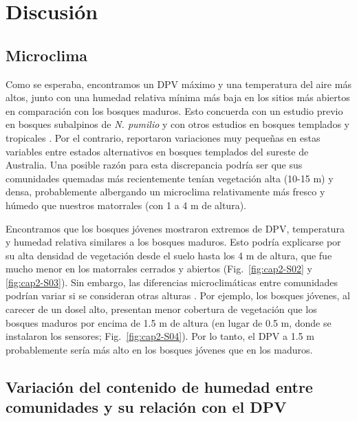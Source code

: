 \FloatBarrier

\section{Discusión}

\subsection{Microclima}

Como se esperaba, encontramos un DPV máximo y una temperatura del aire más altos, junto con una humedad relativa mínima más baja en los sitios más abiertos en comparación con los bosques maduros. Esto concuerda con un estudio previo en bosques subalpinos de \textit{N. pumilio} \citep{paritsis_positive_2015} y con otros estudios en bosques templados y tropicales \citep{uhl_fire_1988, little_fire_2012, hoffmann_fuels_2012, jucker_canopy_2018, de_frenne_global_2019, kane_stand_2021, wolf_wildfire_2021}. Por el contrario, \citet{burton_shifting_2019} reportaron variaciones muy pequeñas en estas variables entre estados alternativos en bosques templados del sureste de Australia. Una posible razón para esta discrepancia podría ser que sus comunidades quemadas más recientemente tenían vegetación alta (10-15 m) y densa, probablemente albergando un microclima relativamente más fresco y húmedo que nuestros matorrales (con 1 a 4 m de altura).

Encontramos que los bosques jóvenes mostraron extremos de DPV, temperatura y humedad relativa similares a los bosques maduros. Esto podría explicarse por su alta densidad de vegetación desde el suelo hasta los 4 m de altura, que fue mucho menor en los matorrales cerrados y abiertos (Fig.~\ref{fig:cap2-S02} y \ref{fig:cap2-S03}). Sin embargo, las diferencias microclimáticas entre comunidades podrían variar si se consideran otras alturas \citep{pickering_darker_2021}. Por ejemplo, los bosques jóvenes, al carecer de un dosel alto, presentan menor cobertura de vegetación que los bosques maduros por encima de 1.5 m de altura (en lugar de 0.5 m, donde se instalaron los sensores; Fig.~\ref{fig:cap2-S04}). Por lo tanto, el DPV a 1.5 m probablemente sería más alto en los bosques jóvenes que en los maduros.

\subsection{Variación del contenido de humedad entre comunidades y su relación con el DPV}

